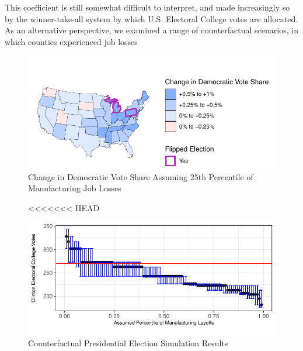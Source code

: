 \documentclass[]{AEA}
\begin{document}
This coefficient is still somewhat difficult to interpret, and made
increasingly so by the winner-take-all system by which U.S. Electoral
College votes are allocated. As an alternative perspective, we examined
a range of counterfactual scenarios, in which counties experienced job
losses

\FloatBarrier
\begin{figure} \label{counterfactual1}
\caption{Change in Democratic Vote Share Assuming 25th Percentile of Manufacturing Job Losses}

\begin{center}\includegraphics{Final-Draft_files/figure-latex/unnamed-chunk-6-1} \end{center}



\FloatBarrier
\end{figure}
\FloatBarrier

\FloatBarrier
\begin{figure} \label{counterfactual2}
<<<<<<< HEAD

\caption{Counterfactual Presidential Election Simulation Results}

\begin{center}\includegraphics{Final-Draft_files/figure-latex/unnamed-chunk-7-1} \end{center}



\FloatBarrier
\end{figure}
\FloatBarrier
\end{document}
